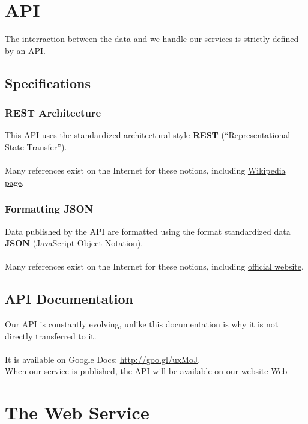 \documentclass{life-fr}
\begin{document}
\section{API}

The interraction between the data and we handle our services is
strictly defined by an API.

\subsection{Specifications}

\subsubsection{REST Architecture}

This API uses the standardized architectural style \textbf{REST}
(``Representational State Transfer'').\\
\\
Many references exist on the Internet for these notions, including
\href{http://fr.wikipedia.org/wiki/Representational_State_Transfer}{Wikipedia page}.

\subsubsection{Formatting JSON}

Data published by the API are formatted using the format
standardized data \textbf{JSON} (JavaScript Object Notation).\\
\\
Many references exist on the Internet for these notions, including
\href{http://www.json.org/}{official website}.

\subsection{API Documentation}

Our API is constantly evolving, unlike this documentation is
why it is not directly transferred to it.\\
\\
It is available on Google Docs: \url{http://goo.gl/uxMoJ}.\\
When our service is published, the API will be available on our website
Web

\section{The Web Service}
\end{document}
